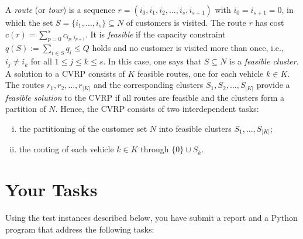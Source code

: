 A \emph{route} (or \emph{tour}) is a sequence
$r=(i_0,i_1,i_2,\ldots,i_s,i_{s+1})$ with $i_0=i_{s+1}=0$, in which the
set $S=\{i_1,\ldots,i_s\}\subseteq N$ of customers is visited. The route
$r$ has cost $c(r)=\sum_{p=0}^sc_{i_p,i_{p+1}}$. It is \emph{feasible}
if the capacity constraint $q(S):=\sum_{i\in S}q_i\leq Q$ holds and no
customer is visited more than once, i.e., $i_j\neq i_k$ for all $1\leq
j\leq k\leq s$. In this case, one says that $S\subseteq N$ is a
\emph{feasible cluster}. A solution to a CVRP consists of $K$ feasible
routes, one for each vehicle $k\in K$. The routes
$r_1,r_2,\ldots,r_{|K|}$ and the corresponding clusters
$S_1,S_2,\ldots,S_{|K|}$ provide a \emph{feasible solution} to the CVRP
if all routes are feasible and the clusters form a partition of
$N$. Hence, the CVRP consists of two interdependent tasks:
\begin{enumerate}[(i)]
\item the partitioning of the customer set $N$ into feasible clusters
  $S_1,\ldots,S_{|K|}$;
\item the routing of each vehicle $k\in K$ through $\{0\}\cup S_k$.
\end{enumerate}



\section{Your Tasks}
\medskip

Using the test instances described below, you have submit a report and a
Python program that address the following tasks:


